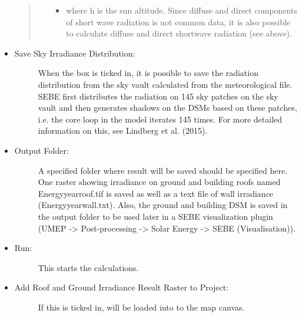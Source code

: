 \documentclass[letterpaper,10pt,english]{sphinxmanual}
\begin{document}
\begin{itemize}
\begin{quote}
\begin{itemize}
\begin{itemize}
\item {} 
where h is the sun altitude. Since diffuse and direct components of short wave radiation is not common data, it is also possible to calculate diffuse and direct shortwave radiation (see above).

\end{itemize}

\end{itemize}
\end{quote}

\item {} \begin{description}
\item[{Save Sky Irradiance Distribution:}] \leavevmode
When the box is ticked in, it is possible to save the radiation distribution from the sky vault calculated from the meteorological file. SEBE first distributes the radiation on 145 sky patches on the sky vault and then generates shadows on the DSMs based on these patches, i.e. the core loop in the model iterates 145 times. For more detailed information on this, see Lindberg et al. (2015).

\end{description}

\item {} \begin{description}
\item[{Output Folder:}] \leavevmode
A specified folder where result will be saved should be specified here. One raster showing irradiance on ground and building roofs named Energyyearroof.tif is saved as well as a text file of wall irradiance (Energyyearwall.txt). Also, the ground and building DSM is saved in the output folder to be used later in a SEBE visualization plugin (UMEP  -\textgreater{} Post-processing  -\textgreater{} Solar Energy  -\textgreater{} SEBE (Visualisation)).

\end{description}

\item {} \begin{description}
\item[{Run:}] \leavevmode
This starts the calculations.

\end{description}

\item {} \begin{description}
\item[{Add Roof and Ground Irradiance Result Raster to Project:}] \leavevmode
If this is ticked in,  will be loaded into to the map canvas.


\end{description}
\end{itemize}
\end{document}
